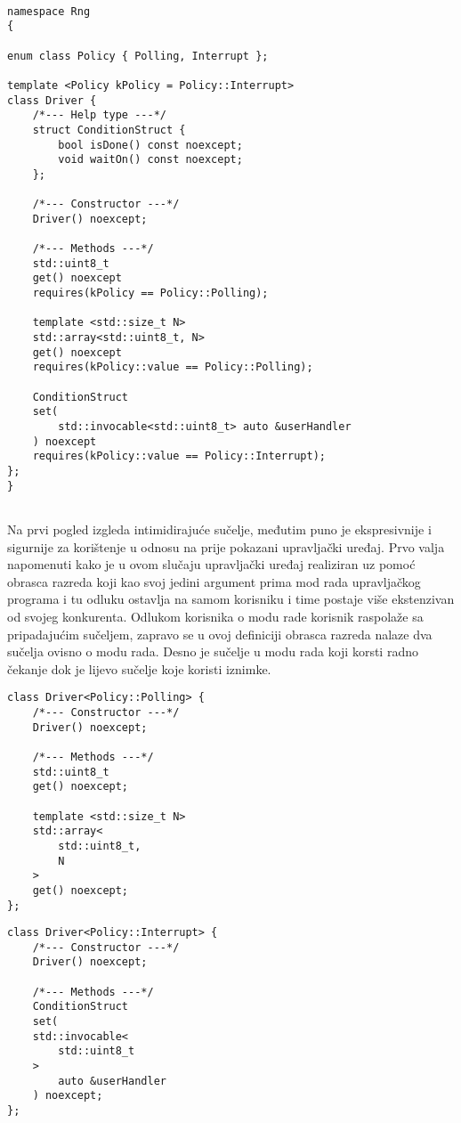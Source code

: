 \begin{lstlisting}

namespace Rng
{

enum class Policy { Polling, Interrupt };

template <Policy kPolicy = Policy::Interrupt>
class Driver {
    /*--- Help type ---*/
    struct ConditionStruct {
        bool isDone() const noexcept;
        void waitOn() const noexcept;
    };

    /*--- Constructor ---*/
    Driver() noexcept;

    /*--- Methods ---*/
    std::uint8_t 
    get() noexcept 
    requires(kPolicy == Policy::Polling);
    
    template <std::size_t N>
    std::array<std::uint8_t, N> 
    get() noexcept 
    requires(kPolicy::value == Policy::Polling);

    ConditionStruct 
    set(
        std::invocable<std::uint8_t> auto &userHandler
    ) noexcept
    requires(kPolicy::value == Policy::Interrupt);
};
}
              
\end{lstlisting}
Na prvi pogled izgleda intimidirajuće sučelje, međutim puno je ekspresivnije i sigurnije za korištenje u odnosu na prije pokazani upravljački uređaj. Prvo valja napomenuti kako je u ovom slučaju upravljački uređaj realiziran uz pomoć obrasca razreda koji kao svoj jedini argument prima mod rada upravljačkog programa i tu odluku ostavlja na samom korisniku i time postaje više ekstenzivan od svojeg konkurenta. Odlukom korisnika o modu rade korisnik raspolaže sa pripadajućim sučeljem, zapravo se u ovoj definiciji obrasca razreda nalaze dva sučelja ovisno o modu rada. Desno je sučelje u modu rada koji korsti radno čekanje dok je lijevo sučelje koje koristi iznimke.
\pagebreak
\begin{multicols}{2}
\lstset{language=C, tabsize=2, frame=single, breaklines=true, showstringspaces=false, basicstyle=\small}
\begin{lstlisting}    
class Driver<Policy::Polling> {
    /*--- Constructor ---*/
    Driver() noexcept;

    /*--- Methods ---*/
    std::uint8_t 
    get() noexcept;
    
    template <std::size_t N>
    std::array<
        std::uint8_t, 
        N
    > 
    get() noexcept;
};
\end{lstlisting}
\columnbreak
\lstset{language=C++, tabsize=1, frame=single, breaklines=true, showstringspaces=false, basicstyle=\small}
\begin{lstlisting}    
class Driver<Policy::Interrupt> {
    /*--- Constructor ---*/
    Driver() noexcept;

    /*--- Methods ---*/
    ConditionStruct 
    set(
    std::invocable<
        std::uint8_t
    >
        auto &userHandler
    ) noexcept;
};
\end{lstlisting}
\end{multicols}
